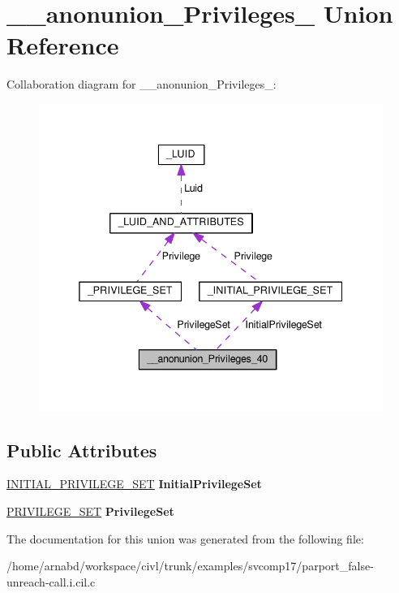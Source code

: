 \hypertarget{union____anonunion__Privileges__40}{}\section{\+\_\+\+\_\+anonunion\+\_\+\+Privileges\+\_ Union Reference}
\label{union____anonunion__Privileges__40}


Collaboration diagram for \+\_\+\+\_\+anonunion\+\_\+\+Privileges\+\_\+:
\nopagebreak
\begin{figure}[H]
\begin{center}
\leavevmode
\includegraphics[width=338pt]{union____anonunion__Privileges__40__coll__graph}
\end{center}
\end{figure}
\subsection*{Public Attributes}
\begin{DoxyCompactItemize}
\item 
\hypertarget{union____anonunion__Privileges__40_ad5ce33b28d8913f10350000e78077229}{}\hyperlink{struct__INITIAL__PRIVILEGE__SET}{I\+N\+I\+T\+I\+A\+L\+\_\+\+P\+R\+I\+V\+I\+L\+E\+G\+E\+\_\+\+S\+E\+T} {\bfseries Initial\+Privilege\+Set}\label{union____anonunion__Privileges__40_ad5ce33b28d8913f10350000e78077229}

\item 
\hypertarget{union____anonunion__Privileges__40_a663b32140a7d1ba4c7a182c4870d41e6}{}\hyperlink{struct__PRIVILEGE__SET}{P\+R\+I\+V\+I\+L\+E\+G\+E\+\_\+\+S\+E\+T} {\bfseries Privilege\+Set}\label{union____anonunion__Privileges__40_a663b32140a7d1ba4c7a182c4870d41e6}

\end{DoxyCompactItemize}


The documentation for this union was generated from the following file\+:\begin{DoxyCompactItemize}
\item 
/home/arnabd/workspace/civl/trunk/examples/svcomp17/parport\+\_\+false-\/unreach-\/call.\+i.\+cil.\+c\end{DoxyCompactItemize}
